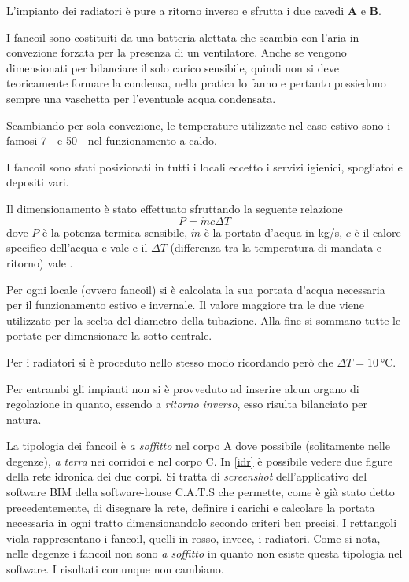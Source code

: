 L'impianto dei radiatori è pure a ritorno inverso e sfrutta i due cavedi \textbf{A} e \textbf{B}. 

I fancoil sono costituiti da una batteria alettata che scambia con l'aria in convezione forzata per la presenza di un ventilatore. Anche se vengono dimensionati per bilanciare il solo carico sensibile, quindi non si deve teoricamente formare la condensa, nella pratica lo fanno e pertanto possiedono sempre una vaschetta per l'eventuale acqua condensata. 

Scambiando per sola convezione, le temperature utilizzate nel caso estivo sono i famosi \num{7} -  e \num{50} -  nel funzionamento a caldo. 

I fancoil sono stati posizionati in tutti i locali eccetto i servizi igienici, spogliatoi e depositi vari.

Il dimensionamento è stato effettuato sfruttando la seguente relazione
\begin{equation}
	P=\dot{m}c\mathit{\Delta} T
\end{equation}
dove $P$ è la potenza termica sensibile, $\dot{m}$ è la portata d'acqua in \si{kg/s}, $c$ è il calore specifico dell'acqua e vale  e il $\Delta T$ (differenza tra la temperatura di mandata e ritorno) vale .

Per ogni locale (ovvero fancoil) si è calcolata la sua portata d'acqua necessaria per il funzionamento estivo e invernale. Il valore maggiore tra le due viene utilizzato per la scelta del diametro della tubazione. Alla fine si sommano tutte le portate per dimensionare la sotto-centrale. 

Per i radiatori si è proceduto nello stesso modo ricordando però \linebreak che $\Delta T=\SI{10}{\degreeCelsius}$.

Per entrambi gli impianti non si è provveduto ad inserire alcun organo di regolazione in quanto, essendo a \emph{ritorno inverso}, esso risulta bilanciato per natura. 

La tipologia dei fancoil è \emph{a soffitto} nel corpo A dove possibile (solitamente nelle degenze), \emph{a terra} nei corridoi e nel corpo C. In \vref{idr} è possibile vedere due figure della rete idronica dei due corpi. Si tratta di \emph{screenshot} dell'applicativo del software BIM della software-house C.A.T.S che permette, come è già stato detto precedentemente, di disegnare la rete, definire i carichi e calcolare la portata necessaria in ogni tratto dimensionandolo secondo criteri ben precisi. I rettangoli viola rappresentano i fancoil, quelli in rosso, invece, i radiatori. Come si nota, nelle degenze i fancoil non sono \emph{a soffitto} in quanto non esiste questa tipologia nel software. I risultati comunque non cambiano.

